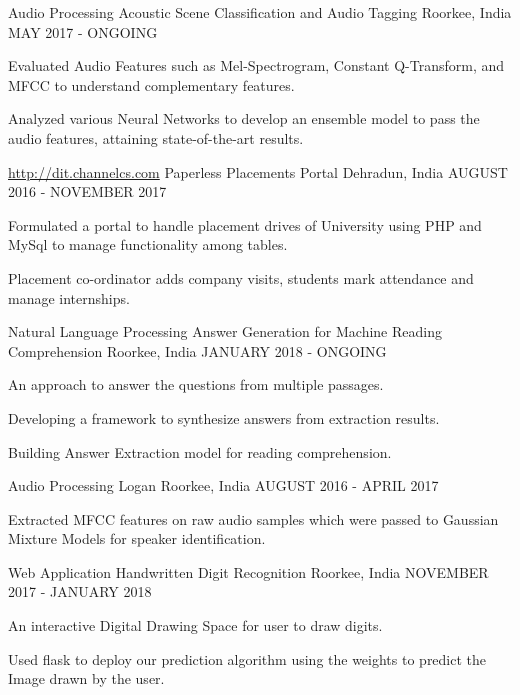 \begin{cventries}
  \cventry
    {Audio Processing}
    {Acoustic Scene Classification and Audio Tagging}
    {Roorkee, India}
    {MAY 2017 - ONGOING}
    {
      \begin{cvitems}
        \item {Evaluated Audio Features such as Mel-Spectrogram, Constant Q-Transform, and MFCC to
        understand complementary features.}
        \item{Analyzed various Neural Networks to develop an ensemble model to pass the
        audio features, attaining state-of-the-art results.}
      \end{cvitems}
    }
  \cventry
    {\href{http://dit.channelcs.com}{http://dit.channelcs.com}}
    {Paperless Placements Portal}
    {Dehradun, India}
    {AUGUST 2016 - NOVEMBER 2017}
    {
      \begin{cvitems}
        \item {Formulated a portal to handle placement drives of University using PHP and MySql to manage functionality among tables.}
        \item {Placement co-ordinator adds company visits, students mark attendance and manage internships.}
      \end{cvitems}
    }
  \cventry
    {Natural Language Processing}
    {Answer Generation for Machine Reading Comprehension}
    {Roorkee, India}
    {JANUARY 2018 - ONGOING}
    {
      \begin{cvitems}
        \item {An approach to answer the questions from multiple passages.}
        \item {Developing a framework to synthesize answers from extraction results.}
        \item {Building Answer Extraction model for reading comprehension.}
      \end{cvitems}
    }
  \cventry
    {Audio Processing}
    {Logan}
    {Roorkee, India}
    {AUGUST 2016 - APRIL 2017}
    {
      \begin{cvitems}
        \item {Extracted MFCC features on raw audio samples which were passed to Gaussian Mixture Models for speaker identification.}
      \end{cvitems}
    }
  \cventry 
    {Web Application}
    {Handwritten Digit Recognition}
    {Roorkee, India}
    {NOVEMBER 2017 - JANUARY 2018}
    {
    \begin{cvitems}
        \item {An interactive Digital Drawing Space for user to draw digits.}
        \item {Used flask to deploy our prediction algorithm using the weights to predict the Image drawn by the user.}
      \end{cvitems}
    }
\end{cventries}
